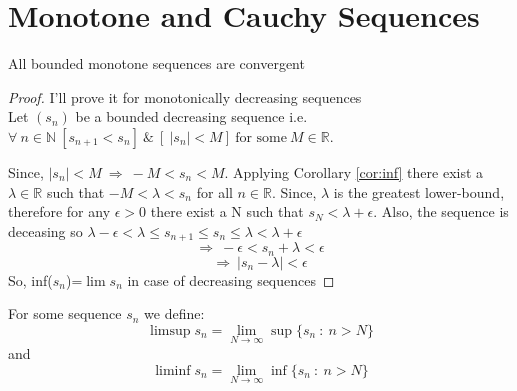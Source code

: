\documentclass{notes}
\begin{document}
 \section{Monotone and Cauchy Sequences}
\begin{theorem}{}
	All bounded monotone sequences are convergent
	\label{bounded}
\end{theorem}
\begin{proof}
	I'll prove it for monotonically decreasing sequences\\
	Let $(s_n)$ be a bounded decreasing sequence i.e. $\forall\ n \in\mathbb{N}\ [s_{n+1}<s_n]\ \&\ [\ |s_n|<M]\ \text{for some}\ M\in \mathbb{R}$.
	
	Since, $|s_n|<M\ \Rightarrow\ - M<s_n<M $. Applying Corollary \ref{cor:inf} there exist a $\lambda \in \mathbb{R}$  such that $-M<\lambda<s_n$ for all $n\in \mathbb{R}$.	Since, $\lambda$ is the greatest lower-bound, therefore for any $\epsilon>0$ there exist a N such that $s_N < \lambda+\epsilon$. Also, the sequence is deceasing so $\lambda - \epsilon<\lambda \leq s_{n+1}\leq s_n\leq\lambda<\lambda + \epsilon\ $
	$$ \Rightarrow\ - \epsilon<s_n + \lambda<\epsilon $$
	$$\Rightarrow\ |s_n - \lambda|<\epsilon $$
	So, inf($s_n$)=$\lim s_n$ in case of decreasing sequences
	
	
\end{proof}

\begin{definition}{}
	For some sequence $s_n$ we define:
	$$\limsup s_n  = \lim_{N\to \infty} \sup \{s_n\ :\ n>N\}$$
	and
	$$\liminf s_n  = \lim_{N\to \infty} \inf \{s_n\ :\ n>N\}$$

\end{definition}
\end{document}
